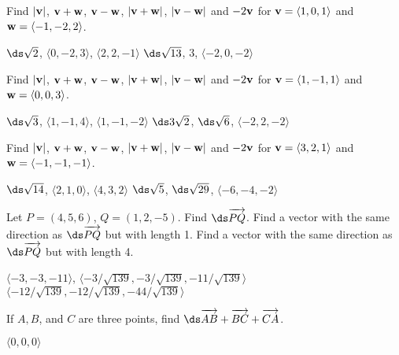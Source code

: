 \begin{exercises}
\begin{exercise}
\begin{exercise}
\begin{exercise}
\begin{exercise}
\begin{exercise}
\begin{exercise} Find $|{\bf v}|$, ${\bf v}+{\bf w}$, ${\bf v}-{\bf w}$,
$|{\bf v}+{\bf w}|$, $|{\bf v}-{\bf w}|$ and $-2{\bf v}$ for
${\bf v} = \langle 1,0,1\rangle$ and ${\bf w} = \langle -1,-2,2 \rangle$.
\begin{answer} $\ds \sqrt{2}$, $\langle 0,-2,3\rangle$, $\langle 2,2,-1\rangle$
$\ds \sqrt{13}$, $3$, $\langle -2, 0, -2\rangle$
\end{answer}\end{exercise}

\begin{exercise} Find $|{\bf v}|$, ${\bf v}+{\bf w}$, ${\bf v}-{\bf w}$,
$|{\bf v}+{\bf w}|$, $|{\bf v}-{\bf w}|$ and $-2{\bf v}$ for
${\bf v} = \langle 1,-1,1\rangle$ and ${\bf w} = \langle 0,0,3\rangle$.
\begin{answer} $\ds \sqrt{3}$, $\langle 1,-1,4\rangle$, $\langle 1,-1,-2\rangle$
$\ds 3\sqrt{2}$, $\ds \sqrt{6}$, $\langle -2, 2, -2\rangle$
\end{answer}\end{exercise}

\begin{exercise} Find $|{\bf v}|$, ${\bf v}+{\bf w}$, ${\bf v}-{\bf w}$,
$|{\bf v}+{\bf w}|$, $|{\bf v}-{\bf w}|$ and $-2{\bf v}$ for
${\bf v} = \langle 3,2,1\rangle$ and ${\bf w} = \langle -1,-1,-1\rangle$.
\begin{answer} $\ds \sqrt{14}$, $\langle 2,1,0\rangle$, $\langle 4,3,2\rangle$
$\ds \sqrt{5}$, $\ds \sqrt{29}$, $\langle -6,-4, -2\rangle$
\end{answer}\end{exercise}

\begin{exercise} Let $P=(4,5,6)$, $Q=(1,2,-5)$. Find 
$\ds \overrightarrow{\vrule height8pt width 0pt PQ}$. Find a vector with
the same direction as $\ds \overrightarrow{\vrule height8pt width 0pt PQ}$
but with length 1. Find a vector with
the same direction as $\ds \overrightarrow{\vrule height8pt width 0pt PQ}$
but with length 4.
\begin{answer} $\langle -3, -3, -11\rangle$,
$\langle -3/\sqrt{139},-3/\sqrt{139},-11/\sqrt{139}\rangle$
$\langle -12/\sqrt{139},-12/\sqrt{139},-44/\sqrt{139}\rangle$
\end{answer}\end{exercise}

\begin{exercise} If $A, B$, and $C$ are three points, find
$\ds \overrightarrow{\vrule height8pt width 0pt AB}+
\overrightarrow{\vrule height8pt width 0pt BC}+
\overrightarrow{\vrule height8pt width 0pt CA}$.
\begin{answer} $\langle 0,0,0\rangle$
\end{answer}\end{exercise}


\end{exercise}
\end{exercise}
\end{exercise}
\end{exercise}
\end{exercise}
\end{exercises}
